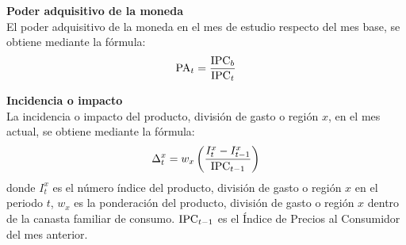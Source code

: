 {\textbf{Poder adquisitivo de la moneda}\\
El poder adquisitivo de la moneda en el mes de estudio respecto del mes base, se obtiene mediante la fórmula:
\begin{align*}
	\text{PA}_t = \frac{\text{IPC}_{b}}{\text{IPC}_{t}}
\end{align*}

\textbf{Incidencia o impacto}\\
La incidencia o impacto del producto, división de gasto o región $x$, en el mes actual, se obtiene mediante la fórmula:
\begin{align*}
	\Delta_{t}^{x} = w_x \left( \frac{I_t^x - I_{t-1}^x}{\text{IPC}_{t-1}} \right)
\end{align*}
donde $I_t^x$ es el número índice del producto, división de gasto o región $x$ en el periodo $t$, $w_x$ es la ponderación del producto, división de gasto o región $x$ dentro de la canasta familiar de consumo. $\text{IPC}_{t-1}$ es el Índice de Precios al Consumidor del mes anterior.\\
}